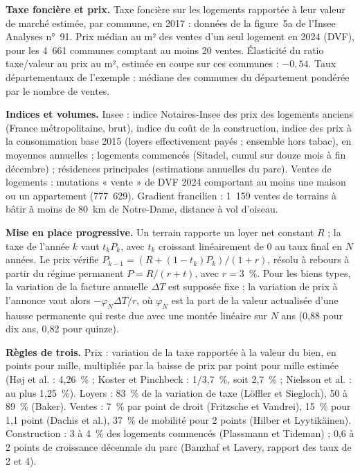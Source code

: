 \documentclass[11pt,a4paper]{article}
\begin{document}
\textbf{Taxe foncière et prix.} Taxe foncière sur les logements rapportée à leur valeur de marché
estimée, par commune, en 2017 : données de la figure~5a de l'Insee Analyses n°~91. Prix médian au
m² des ventes d'un seul logement en 2024 (DVF), pour les 4~661 communes comptant au moins 20 ventes.
Élasticité du ratio taxe/valeur au prix au m², estimée en coupe sur ces communes : $-0{,}54$. Taux
départementaux de l'exemple : médiane des communes du département pondérée par le nombre de ventes.

\textbf{Indices et volumes.} Insee : indice Notaires-Insee des prix des logements anciens (France
métropolitaine, brut), indice du coût de la construction, indice des prix à la consommation base
2015 (loyers effectivement payés ; ensemble hors tabac), en moyennes annuelles ; logements commencés
(Sitadel, cumul sur douze mois à fin décembre) ; résidences principales (estimations annuelles du
parc). Ventes de logements : mutations « vente » de DVF 2024 comportant au moins une maison ou un
appartement (777~629). Gradient francilien : 1~159 ventes de terrains à bâtir à moins de 80~km de
Notre-Dame, distance à vol d'oiseau.

\textbf{Mise en place progressive.} Un terrain rapporte un loyer net constant $R$ ; la taxe de
l'année $k$ vaut $t_k P_k$, avec $t_k$ croissant linéairement de 0 au taux final en $N$ années. Le
prix vérifie $P_{k-1} = \left(R + (1-t_k) P_k\right)/(1+r)$, résolu à rebours à partir du régime
permanent $P = R/(r+t)$, avec $r = 3$~\%. Pour les biens types, la variation de la facture
annuelle $\Delta T$ est supposée fixe ; la variation de prix à l'annonce vaut alors
$-\varphi_N \Delta T / r$, où $\varphi_N$ est la part de la valeur actualisée d'une hausse
permanente qui reste due avec une montée linéaire sur $N$ ans (0,88 pour dix ans, 0,82 pour quinze).

\textbf{Règles de trois.} Prix : variation de la taxe rapportée à la valeur du bien, en points pour
mille, multipliée par la baisse de prix par point pour mille estimée (Høj et al. : 4,26~\% ;
Koster et Pinchbeck : 1/3,7~\%, soit 2,7~\% ; Nielsson et al. : au plus 1,25~\%). Loyers : 83~\%
de la variation de taxe (Löffler et Siegloch), 50 à 89~\% (Baker). Ventes : 7~\% par point de
droit (Fritzsche et Vandrei), 15~\% pour 1,1 point (Dachis et al.), 37~\% de mobilité pour 2 points
(Hilber et Lyytikäinen). Construction : 3 à 4~\% des logements commencés (Plassmann et Tideman) ;
0,6 à 2 points de croissance décennale du parc (Banzhaf et Lavery, rapport des taux de 2 et 4).
\end{document}
